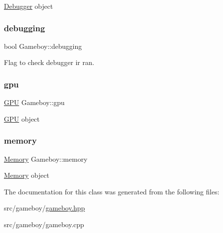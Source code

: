 \mbox{\hyperlink{classDebugger}{Debugger}} object \mbox{\label{classGameboy_a3806b14c93f07ab3aa7c8bce7f47ac5e}} 
\subsubsection{\texorpdfstring{debugging}{debugging}}
{\footnotesize\ttfamily bool Gameboy\+::debugging\hspace{0.3cm}{\ttfamily [private]}}

Flag to check debugger ir ran. \mbox{\label{classGameboy_ab5374ee382793a6e7f4fe26e55c9ff94}} 
\subsubsection{\texorpdfstring{gpu}{gpu}}
{\footnotesize\ttfamily \mbox{\hyperlink{classGPU}{G\+PU}} Gameboy\+::gpu\hspace{0.3cm}{\ttfamily [private]}}

\mbox{\hyperlink{classGPU}{G\+PU}} object \mbox{\label{classGameboy_adf627b4691eb953f162584daf2b539a9}} 
\subsubsection{\texorpdfstring{memory}{memory}}
{\footnotesize\ttfamily \mbox{\hyperlink{classMemory}{Memory}} Gameboy\+::memory\hspace{0.3cm}{\ttfamily [private]}}

\mbox{\hyperlink{classMemory}{Memory}} object 

The documentation for this class was generated from the following files\+:\begin{DoxyCompactItemize}
\item 
src/gameboy/\mbox{\hyperlink{gameboy_8hpp}{gameboy.\+hpp}}\item 
src/gameboy/gameboy.\+cpp\end{DoxyCompactItemize}
